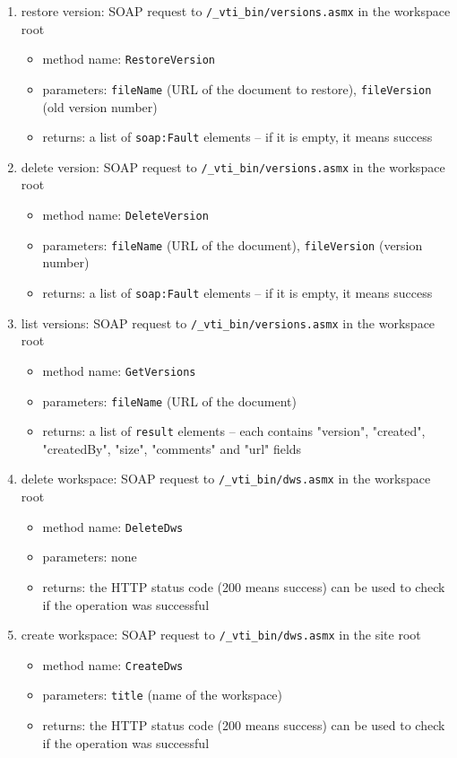 \begin{enumerate}
\item restore version: SOAP request to \texttt{/\_vti\_bin/versions.asmx} in the workspace root
\begin{itemize}
\item method name: \texttt{RestoreVersion}
\item parameters: \texttt{fileName} (URL of the document to restore), \texttt{fileVersion} (old version number)
\item returns: a list of \texttt{soap:Fault} elements -- if it is empty, it means success
\end{itemize}

\item delete version: SOAP request to \texttt{/\_vti\_bin/versions.asmx} in the workspace root
\begin{itemize}
\item method name: \texttt{DeleteVersion}
\item parameters: \texttt{fileName} (URL of the document), \texttt{fileVersion} (version number)
\item returns: a list of \texttt{soap:Fault} elements -- if it is empty, it means success
\end{itemize}

\item list versions: SOAP request to \texttt{/\_vti\_bin/versions.asmx} in the workspace root
\begin{itemize}
\item method name: \texttt{GetVersions}
\item parameters: \texttt{fileName} (URL of the document)
\item returns: a list of \texttt{result} elements -- each contains "version", "created", "createdBy", "size", "comments" and "url" fields
\end{itemize}

\item delete workspace: SOAP request to \texttt{/\_vti\_bin/dws.asmx} in the workspace root
\begin{itemize}
\item method name: \texttt{DeleteDws}
\item parameters: none
\item returns: the HTTP status code (200 means success) can be used to check if the operation was successful
\end{itemize}

\item create workspace: SOAP request to \texttt{/\_vti\_bin/dws.asmx} in the site root
\begin{itemize}
\item method name: \texttt{CreateDws}
\item parameters: \texttt{title} (name of the workspace)
\item returns: the HTTP status code (200 means success) can be used to check if the operation was successful
\end{itemize}


\end{enumerate}

